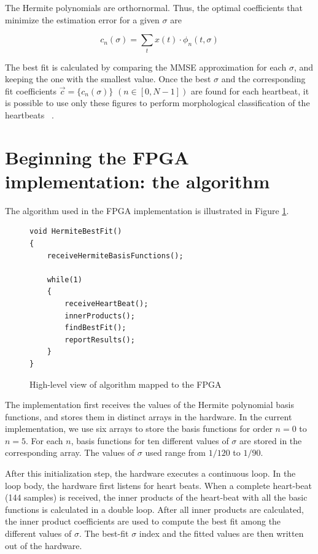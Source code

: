 \documentclass[runningheads]{llncs}
\begin{document}
The Hermite polynomials are orthornormal.  Thus, the optimal coefficients that 
minimize the estimation error for a given $\sigma$ are

\begin{equation}\label{eqn:c}
c_n(\sigma)=\sum_{t} x(t)\cdot \phi_n(t,\sigma) 
\end{equation}

The best fit is calculated by comparing the MMSE approximation for each $\sigma$, and keeping
the one with the smallest value.
Once the best $\sigma$ and the corresponding fit coefficients $\vec{c}=\{c_n(\sigma)\}$  \mbox{$(n\in [0,N-1])$} 
are found for each heartbeat, it is possible to use only these figures to perform morphological 
classification of the heartbeats \textrm{~\cite{j:lagerholm00}}.

\section{Beginning the FPGA implementation: the algorithm} \label{s:algorithm}

The algorithm used in the FPGA implementation is illustrated in 
Figure \ref{fig:FpgaAlgo}.
\begin{figure}
\begin{centering}
\begin{verbatim}
void HermiteBestFit()
{  
    receiveHermiteBasisFunctions();

    while(1)
    {
        receiveHeartBeat();
        innerProducts();
        findBestFit();
        reportResults();
    }
}
\end{verbatim}
\end{centering}
\caption{High-level view of algorithm mapped to the FPGA}
\label{fig:FpgaAlgo}
\end{figure}

The implementation first receives the values of the Hermite polynomial basis
functions, and  stores them in distinct arrays in the hardware.  In the
current implementation, we use six
arrays to store the basis functions for order $n=0$ to $n=5$.  For each
$n$, basis functions for ten different values of $\sigma$ are stored in the corresponding
array.  The values of $\sigma$ used range from $1/120$ to $1/90$.

After this initialization step, the hardware executes a continuous loop.  
In the loop body, the hardware first listens for heart beats. When
a complete heart-beat (144 samples) is received, the inner products of the
heart-beat with all the basic functions is calculated in a double loop.  
After all inner products are calculated, the inner product coefficients
are used to compute the best fit among the different values of $\sigma$.
The best-fit $\sigma$ index and the fitted values are then written
out of the hardware.
\end{document}
